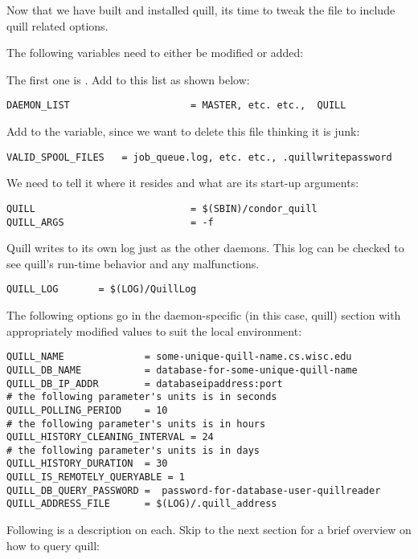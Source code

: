 \begin{enumerate}
Now that we have built and installed quill, its time to tweak the 
 file to include quill related options.

The following variables need to either be modified or added:

The first one is .  Add  to this
list as shown below:

\begin{verbatim}
DAEMON_LIST                     = MASTER, etc. etc.,  QUILL
\end{verbatim}

Add  to the 
variable, since we  want  to delete this file
thinking it is junk:

\begin{verbatim}
VALID_SPOOL_FILES	= job_queue.log, etc. etc., .quillwritepassword
\end{verbatim}

We need to tell it where it resides and what are its start-up arguments:
\begin{verbatim}
QUILL                           = $(SBIN)/condor_quill
QUILL_ARGS                      = -f
\end{verbatim}

Quill writes to its own log just as the other daemons.  This log can be 
checked to see quill's run-time behavior and any malfunctions.
\begin{verbatim}
QUILL_LOG       = $(LOG)/QuillLog
\end{verbatim}

The following options go in the daemon-specific (in this case, quill) 
section with appropriately modified values to suit the local environment:

\begin{verbatim}
QUILL_NAME              = some-unique-quill-name.cs.wisc.edu
QUILL_DB_NAME           = database-for-some-unique-quill-name
QUILL_DB_IP_ADDR        = databaseipaddress:port
# the following parameter's units is in seconds
QUILL_POLLING_PERIOD    = 10
# the following parameter's units is in hours
QUILL_HISTORY_CLEANING_INTERVAL = 24
# the following parameter's units is in days
QUILL_HISTORY_DURATION 	= 30
QUILL_IS_REMOTELY_QUERYABLE = 1
QUILL_DB_QUERY_PASSWORD =  password-for-database-user-quillreader
QUILL_ADDRESS_FILE      = $(LOG)/.quill_address
\end{verbatim}

Following is a description on each.  Skip to the next section for a brief 
overview on how to query quill:


\end{enumerate}
